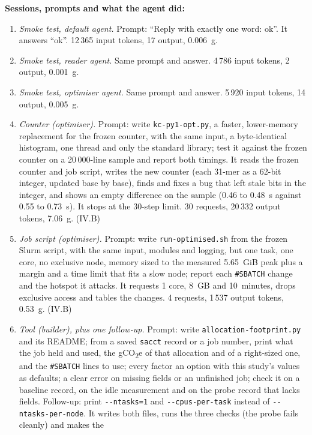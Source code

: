 \documentclass[conference,a4paper]{IEEEtran}
\begin{document}
\textbf{Sessions, prompts and what the agent did:}
\begin{enumerate}
\item \emph{Smoke test, default agent.} Prompt: ``Reply with exactly one word:
  ok''. It answers ``ok''. 12\,365 input tokens, 17 output, 0.006~g.
\item \emph{Smoke test, reader agent.} Same prompt and answer. 4\,786 input
  tokens, 2 output, 0.001~g.
\item \emph{Smoke test, optimiser agent.} Same prompt and answer. 5\,920 input
  tokens, 14 output, 0.005~g.
\item \emph{Counter (optimiser).} Prompt: write \texttt{kc-py1-opt.py}, a
  faster, lower-memory replacement for the frozen counter, with the same input,
  a byte-identical histogram, one thread and only the standard library; test it
  against the frozen counter on a 20\,000-line sample and report both timings.
  It reads the frozen counter and job script, writes the new counter (each
  31-mer as a 62-bit integer, updated base by base), finds and fixes a bug that
  left stale bits in the integer, and shows an empty difference on the sample
  (0.46 to 0.48~s against 0.55 to 0.73~s). It stops at the 30-step limit.
  30 requests, 20\,332 output tokens, 7.06~g. (IV.B)
\item \emph{Job script (optimiser).} Prompt: write \texttt{run-optimised.sh}
  from the frozen Slurm script, with the same input, modules and logging, but
  one task, one core, no exclusive node, memory sized to the measured
  5.65~GiB peak plus a margin and a time limit that fits a slow node; report
  each \texttt{\#SBATCH} change and the hotspot it attacks. It requests 1 core,
  8~GB and 10~minutes, drops exclusive access and tables the changes.
  4 requests, 1\,537 output tokens, 0.53~g. (IV.B)
\item \emph{Tool (builder), plus one follow-up.} Prompt: write
  \texttt{allocation-footprint.py} and its README; from a saved
  \texttt{sacct} record or a job number, print what the job held and used, the
  gCO\textsubscript{2}e of that allocation and of a right-sized one, and the
  \texttt{\#SBATCH} lines to use; every factor an option with this study's
  values as defaults; a clear error on missing fields or an unfinished job;
  check it on a baseline record, on the idle measurement and on the probe
  record that lacks fields. Follow-up: print \texttt{-{}-ntasks=1} and
  \texttt{-{}-cpus-per-task} instead of \texttt{-{}-ntasks-per-node}. It writes
  both files, runs the three checks (the probe fails cleanly) and makes the

\end{enumerate}
\end{document}
